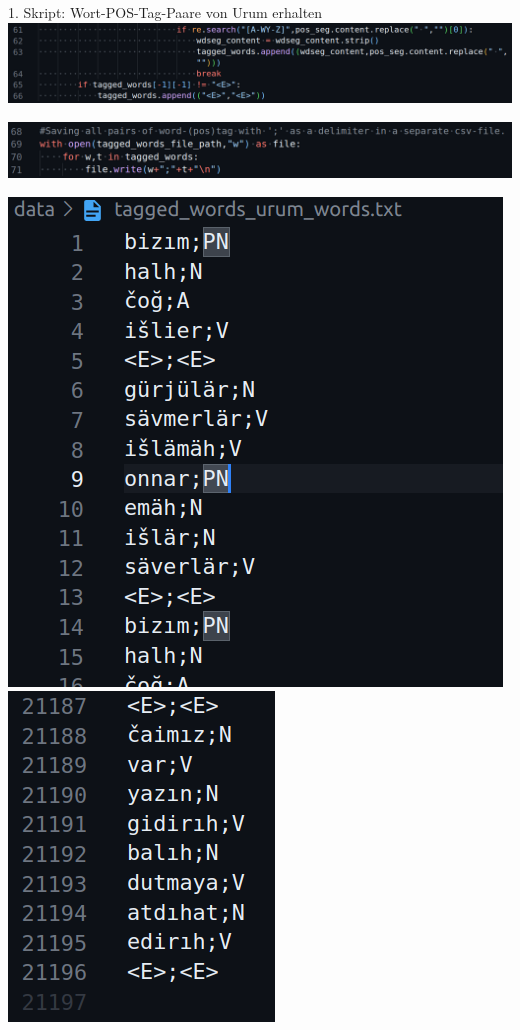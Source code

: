 \documentclass{beamer}
\begin{document}
\begin{frame}[t]{1. Skript: Wort-POS-Tag-Paare von Urum erhalten}
	\includegraphics[scale=0.4]{"./pics/get_urum_script_pics/04.png"}
	
	\medskip
	\includegraphics[scale=0.45]{"./pics/get_urum_script_pics/05.png"}
	
	\includegraphics[scale=0.45]{"./pics/get_urum_script_pics/06.png"}
	\includegraphics[scale=0.45]{"./pics/get_urum_script_pics/07.png"}
\end{frame}
\end{document}
